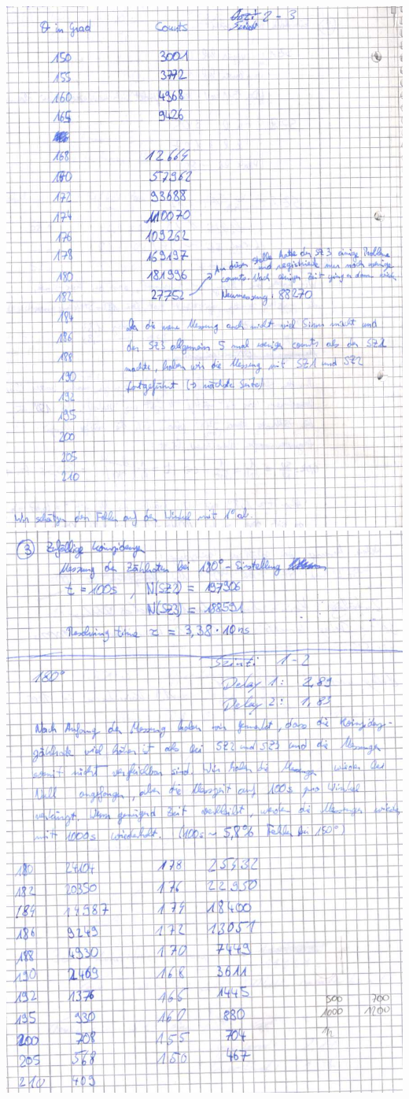 \includegraphics[scale=0.55]{Messprotokoll/0006.jpeg}
\clearpage
\includegraphics[scale=0.55]{Messprotokoll/0007.jpeg}
